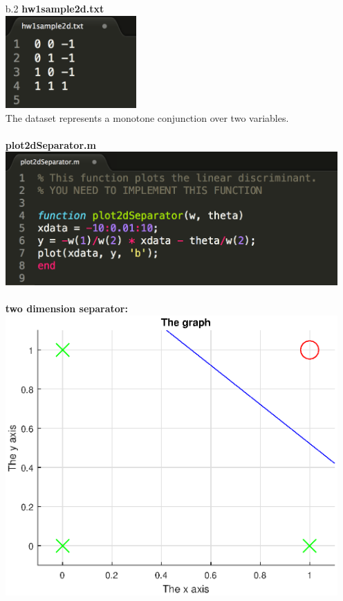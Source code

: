 \begin{enumerate}
\begin{enumerate}
\begin{enumerate}
			\item[b.2] \textbf{hw1sample2d.txt} \\
			\includegraphics[width=5cm]{data_1.png}\\
			The dataset represents a monotone conjunction over two variables.\\\\
			\textbf{plot2dSeparator.m}\\
			\includegraphics[width=13cm]{code_3}\\\\
			\textbf{two dimension separator:}\\
			\includegraphics[width=13cm]{figure_1}\\

\end{enumerate}
\end{enumerate}
\end{enumerate}
